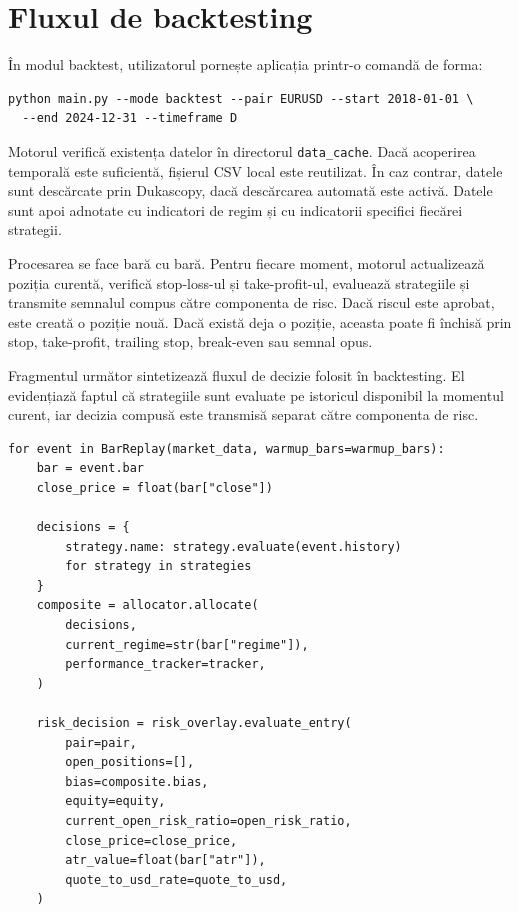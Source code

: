 \section{Fluxul de backtesting}
\label{cap:cap3:backtest}

În modul backtest, utilizatorul pornește aplicația printr-o comandă de forma:

\begin{code}
\begin{verbatim}
python main.py --mode backtest --pair EURUSD --start 2018-01-01 \
  --end 2024-12-31 --timeframe D
\end{verbatim}
\caption{Exemplu de comandă pentru rularea unui backtest}
\label{code:backtest_command}
\end{code}

Motorul verifică existența datelor în directorul \texttt{data\_cache}. Dacă acoperirea temporală este suficientă, fișierul CSV local este reutilizat. În caz contrar, datele sunt descărcate prin Dukascopy, dacă descărcarea automată este activă. Datele sunt apoi adnotate cu indicatori de regim și cu indicatorii specifici fiecărei strategii.

Procesarea se face bară cu bară. Pentru fiecare moment, motorul actualizează poziția curentă, verifică stop-loss-ul și take-profit-ul, evaluează strategiile și transmite semnalul compus către componenta de risc. Dacă riscul este aprobat, este creată o poziție nouă. Dacă există deja o poziție, aceasta poate fi închisă prin stop, take-profit, trailing stop, break-even sau semnal opus.

Fragmentul următor sintetizează fluxul de decizie folosit în backtesting. El evidențiază faptul că strategiile sunt evaluate pe istoricul disponibil la momentul curent, iar decizia compusă este transmisă separat către componenta de risc.

\begin{code}
\begin{verbatim}
for event in BarReplay(market_data, warmup_bars=warmup_bars):
    bar = event.bar
    close_price = float(bar["close"])

    decisions = {
        strategy.name: strategy.evaluate(event.history)
        for strategy in strategies
    }
    composite = allocator.allocate(
        decisions,
        current_regime=str(bar["regime"]),
        performance_tracker=tracker,
    )

    risk_decision = risk_overlay.evaluate_entry(
        pair=pair,
        open_positions=[],
        bias=composite.bias,
        equity=equity,
        current_open_risk_ratio=open_risk_ratio,
        close_price=close_price,
        atr_value=float(bar["atr"]),
        quote_to_usd_rate=quote_to_usd,
    )
\end{verbatim}
\caption{Sinteză a fluxului de decizie din backtesting}
\label{code:flux_decizie_backtest}
\end{code}

